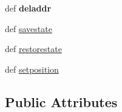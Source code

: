 \begin{DoxyCompactItemize}
\item 
\hypertarget{classcore_1_1netns_1_1nodes_1_1_r_j45_node_aa1fee08aac669908e94b225c8890a9fe}{def {\bfseries deladdr}}\label{classcore_1_1netns_1_1nodes_1_1_r_j45_node_aa1fee08aac669908e94b225c8890a9fe}

\item 
def \hyperlink{classcore_1_1netns_1_1nodes_1_1_r_j45_node_a9b7a45004fce13e2a96f3eae326ee5c0}{savestate}
\item 
def \hyperlink{classcore_1_1netns_1_1nodes_1_1_r_j45_node_ac667b7c46ef8ae4a31cfee5bfca025f8}{restorestate}
\item 
def \hyperlink{classcore_1_1netns_1_1nodes_1_1_r_j45_node_a3af3f276afdd9ce7a17ab50c54ae27c4}{setposition}
\end{DoxyCompactItemize}
\subsection*{Public Attributes}
